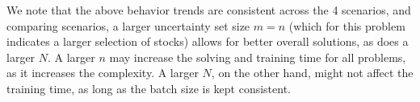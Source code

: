 \documentclass[11pt]{article}
\begin{document}
We note that the above behavior trends are consistent across the 4 scenarios, and comparing scenarios, a larger uncertainty set size $m = n$ (which for this problem indicates a larger selection of stocks) allows for better overall solutions, as does a larger $N$. 
A larger $n$ may increase the solving and training time for all problems, as it increases the complexity. A larger $N$, on the other hand, might not affect the training time, as long as the batch size is kept consistent. 
\end{document}
